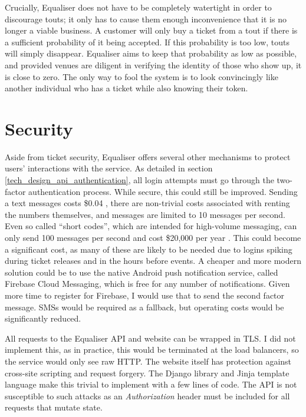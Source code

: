 \documentclass[12pt,a4paper]{bhamdissertation}
\begin{document}
Crucially, Equaliser does not have to be completely watertight in order to discourage touts; it only has to cause them enough inconvenience that it is no longer a viable business. A customer will only buy a ticket from a tout if there is a sufficient probability of it being accepted. If this probability is too low, touts will simply disappear. Equaliser aims to keep that probability as low as possible, and provided venues are diligent in verifying the identity of those who show up, it is close to zero. The only way to fool the system is to look convincingly like another individual who has a ticket while also knowing their token.

\section{Security}

Aside from ticket security, Equaliser offers several other mechanisms to protect users' interactions with the service. As detailed in section \ref{tech_design_api_authentication}, all login attempts must go through the two-factor authentication process. While secure, this could still be improved. Sending a text messages costs \$0.04 \cite{T17}, there are non-trivial costs associated with renting the numbers themselves, and messages are limited to 10 messages per second. Even so called ``short codes'', which are intended for high-volume messaging, can only send 100 messages per second and cost \$20,000 per year \cite{T17}. This could become a significant cost, as many of these are likely to be needed due to logins spiking during ticket releases and in the hours before events. A cheaper and more modern solution could be to use the native Android push notification service, called Firebase Cloud Messaging, which is free for any number of notifications. Given more time to register for Firebase, I would use that to send the second factor message. SMSs would be required as a fallback, but operating costs would be significantly reduced.

All requests to the Equaliser API and website can be wrapped in TLS. I did not implement this, as in practice, this would be terminated at the load balancers, so the service would only see raw HTTP. The website itself has protection against cross-site scripting and request forgery. The Django library and Jinja template language make this trivial to implement with a few lines of code. The API is not susceptible to such attacks as an \textit{Authorization} header must be included for all requests that mutate state.
\end{document}
